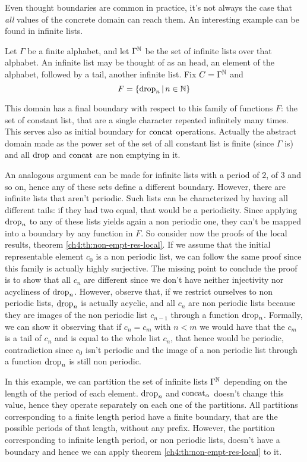 Even thought boundaries are common in practice, it's not always the case that \textit{all} values of the concrete domain can reach them. An interesting example can be found in infinite lists.
\begin{example}\label{ch4:ex:infinite-lists-fix-c0}
	Let $\Gamma$ be a finite alphabet, and let $\Gamma^{\mathbb{N}}$ be the set of infinite lists over that alphabet. An infinite list may be thought of as an head, an element of the alphabet, followed by a tail, another infinite list.
	Fix $C = \Gamma^{\mathbb{N}}$ and
	\[
	F = \{ \text{drop}_n \,\vert\, n \in \mathbb{N} \}
	\]

	This domain has a final boundary with respect to this family of functions $F$: the set of constant list, that are a single character repeated infinitely many times.
	This serves also as initial boundary for $\text{concat}$ operations. Actually the abstract domain made as the power set of the set of all constant list is finite (since $\Gamma$ is) and all $\text{drop}$ and $\text{concat}$ are non emptying in it.

	An analogous argument can be made for infinite lists with a period of $2$, of $3$ and so on, hence any of these sets define a different boundary.
	However, there are infinite lists that aren't periodic. Such lists can be characterized by having all different tails: if they had two equal, that would be a periodicity. Since applying $\text{drop}_n$ to any of these lists yields again a non periodic one, they can't be mapped into a boundary by any function in $F$.
	So consider now the proofs of the local results, theorem \ref{ch4:th:non-empt-res-local}. If we assume that the initial representable element $c_0$ is a non periodic list, we can follow the same proof since this family is actually highly surjective. The missing point to conclude the proof is to show that all $c_n$ are different since we don't have neither injectivity nor acycliness of $\text{drop}_n$.
	However, observe that, if we restrict ourselves to non periodic lists, $\text{drop}_n$ is actually acyclic, and all $c_n$ are non periodic lists because they are images of the non periodic list $c_{n-1}$ through a function $\text{drop}_n$.
	Formally, we can show it observing that if $c_n = c_m$ with $n < m$ we would have that the $c_m$ is a tail of $c_n$ and is equal to the whole list $c_n$, that hence would be periodic, contradiction since $c_0$ isn't periodic and the image of a non periodic list through a function $\text{drop}_n$ is still non periodic.
\end{example}
In this example, we can partition the set of infinite lists $\Gamma^{\mathbb{N}}$ depending on the length of the period of each element. $\text{drop}_n$ and $\text{concat}_{\alpha}$ doesn't change this value, hence they operate separately on each one of the partitions. All partitions corresponding to a finite length period have a finite boundary, that are the possible periods of that length, without any prefix. However, the partition corresponding to infinite length period, or non periodic lists, doesn't have a boundary and hence we can apply theorem \ref{ch4:th:non-empt-res-local} to it.

